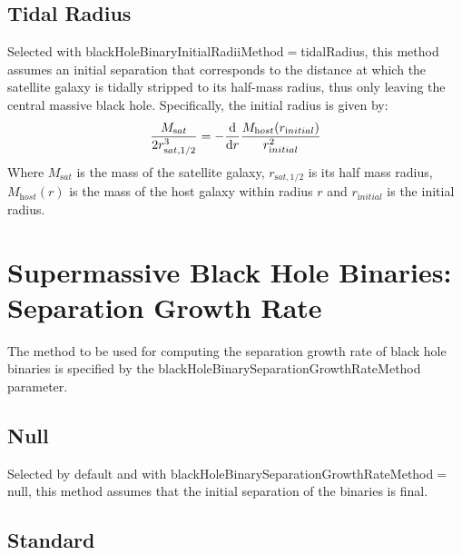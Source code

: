 \subsection{Tidal Radius}

Selected with {\normalfont \ttfamily blackHoleBinaryInitialRadiiMethod}$=${\normalfont \ttfamily tidalRadius}, this method assumes an initial separation that corresponds to the distance at which the satellite galaxy is tidally stripped to its half-mass radius, thus only leaving the central massive black hole.
Specifically, the initial radius is given by:
\begin{equation}
{M_{\mathrm sat} \over 2 r_{\mathrm sat,1/2}^3 } = - {{\mathrm d} \over {\mathrm d} r} {M_{\mathrm host}(r_{\mathrm initial}) \over r_{\mathrm initial}^2}
\end{equation}
Where $M_{\mathrm sat}$ is the mass of the satellite galaxy, $r_{\mathrm sat,1/2}$ is its half mass radius, $M_{\mathrm host}(r)$ is the mass of the host galaxy within radius $r$ and $r_{\mathrm initial}$ is the initial radius.

\section{Supermassive Black Hole Binaries: Separation Growth Rate}

The method to be used for computing the separation growth rate of black hole binaries is specified by the {\normalfont \ttfamily blackHoleBinarySeparationGrowthRateMethod} parameter.

\subsection{Null}

Selected by default and with {\normalfont \ttfamily blackHoleBinarySeparationGrowthRateMethod}$=${\normalfont \ttfamily null}, this method assumes that the initial separation of the binaries is final.

\subsection{Standard}

